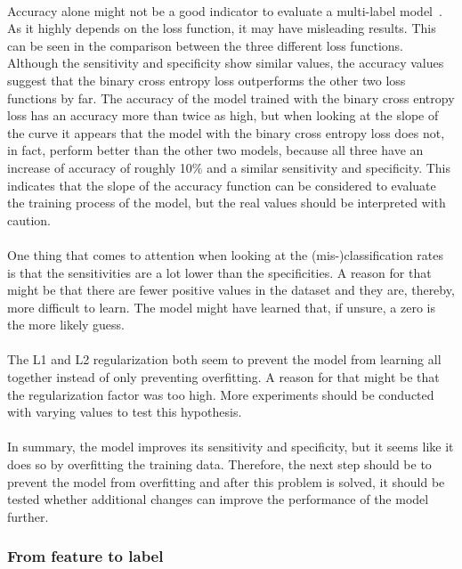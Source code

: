 \\
Accuracy alone might not be a good indicator to evaluate a multi-label model~\citep{gibaja2015}. As it highly depends on the loss function, it may have misleading results. This can be seen in the comparison between the three different loss functions. Although the sensitivity and specificity show similar values, the accuracy values suggest that the binary cross entropy loss outperforms the other two loss functions by far. The accuracy of the model trained with the binary cross entropy loss has an accuracy more than twice as high, but when looking at the slope of the curve it appears that the model with the binary cross entropy loss does not, in fact, perform better than the other two models, because all three have an increase of accuracy of roughly 10\% and a similar sensitivity and specificity. This indicates that the slope of the accuracy function can be considered to evaluate the training process of the model, but the real values should be interpreted with caution. \\
\\
One thing that comes to attention when looking at the (mis-)classification rates is that the sensitivities are a lot lower than the specificities. A reason for that might be that there are fewer positive values in the dataset and they are, thereby, more difficult to learn. The model might have learned that, if unsure, a zero is the more likely guess. \\
\\
The L1 and L2 regularization both seem to prevent the model from learning all together instead of only preventing overfitting. A reason for that might be that the regularization factor was too high. More experiments should be conducted with varying values to test this hypothesis. \\
\\
In summary, the model improves its sensitivity and specificity, but it seems like it does so by overfitting the training data. Therefore, the next step should be to prevent the model from overfitting and after this problem is solved, it should be tested whether additional changes can improve the performance of the model further.



\subsubsection{From feature to label}


